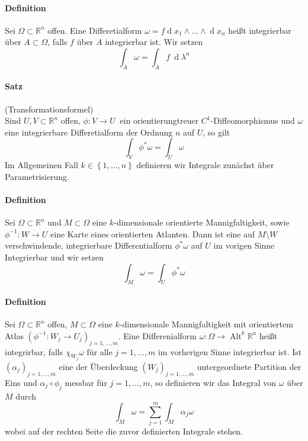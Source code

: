 \documentclass[12pt,a4paper,fleqn]{article}
\def\set#1{{\left\{ #1 \right\}}}
\def\R{{\mathbb{R}}}
\def\d{{\operatorname{d}}}
\begin{document}
\paragraph{Definition} Sei $\Omega\subset \R^n$ offen. Eine Differetialform $\omega= f\d x_1\wedge\dots\wedge\d x_n$ heißt integrierbar über $A\subset\Omega$, falls $f$ über $A$ integrierbar ist. Wir setzen
\begin{displaymath}
\int_A \omega = \int_A f\ \d\lambda^n
\end{displaymath}

\paragraph{Satz} (Transformationsformel)\\
Sind $U, V\subset \R^n$ offen, $\phi\colon V \rightarrow U\ $ ein orientierungtreuer $C^1$-Diffeomorphismus und $\omega$ eine integrierbare Differetialform der Ordnung $n$ auf $U$, so gilt
\begin{displaymath}
\int_V \phi^\ast\omega = \int_U \omega
\end{displaymath}
Im Allgemeinen Fall $k \in \set{1, \dots, n}$ definieren wir Integrale zunächst über Parametrisierung.

\paragraph{Definition} Sei $\Omega\subset\R^n$ und $M\subset\Omega$ eine $k$-dimensionale orientierte Mannigfaltigkeit, sowie $\phi^{-1}\colon W \rightarrow U$ eine Karte eines orientierten Atlanten. Dann ist eine auf $M\setminus W$ verschwindende, integrierbare Differentialform $\phi^\ast\omega$ auf $U$ im vorigen Sinne Integrierbar und wir setzen
\begin{displaymath}
\int_M \omega = \int_U \phi^\ast\omega
\end{displaymath}

\paragraph{Definition} Sei $\Omega\subset\R^n$ offen, $M\subset\Omega$ eine $k$-dimensionale Mannigfaltigkeit mit orientiertem Atlas $(\phi^{-1}\colon W_j \rightarrow U_j)_{j = 1, \dots, m}$. Eine Differenialform $\omega\colon \Omega \rightarrow\operatorname{Alt}^k \R^n$ heißt integrirbar, falls $\chi_{W_j}\omega$ für alle $j=1, \dots, m$ im vorherigen Sinne integrierbar ist. Ist $(\alpha_j)_{j=1, \dots, m}$ eine der Überdeckung $(W_j)_{j=1, \dots, m}$ untergeordnete Partition der Eins und $\alpha_j\circ\phi_j$ messbar für $j=1, \dots, m$, so definieren wir das Integral von $\omega$ über $M$ durch
\begin{displaymath}
\int_M \omega = \sum_{j=1}^m \int_M \alpha_j\omega
\end{displaymath}
wobei auf der rechten Seite die zuvor definierten Integrale stehen.
\end{document}
